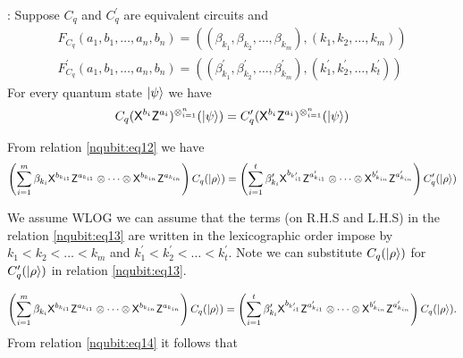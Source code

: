 : Suppose $C_q$ and $C_q^\prime$ are equivalent circuits and 
\begin{equation*}
\begin{aligned}
F_{C_q}(a_1,b_1,\ldots,a_n,b_n)= ((\beta_{k_1}, \beta_{k_2},\ldots, \beta_{k_m}),(k_1,k_2,\ldots, k_m)) \\
F_{C_q}^\prime(a_1,b_1,\ldots,a_n,b_n)= ((\beta_{k_1}^\prime, \beta_{k_2}^\prime,\ldots, \beta_{k_m}^\prime),(k_1^\prime,k_2^\prime,\ldots, k_t^\prime)) 
\end{aligned}
\end{equation*}
For every quantum state ${\lvert}\psi\rangle$ we have
\begin{equation}
\label{nqubit:eq12}
\begin{aligned}
C_q ({\sf X}^{b_i}{\sf Z}^{a_i})^{\otimes_{i=1}^n}({\lvert}\psi\rangle)=C_q^\prime ({\sf X}^{b_i}{\sf Z}^{a_i})^{\otimes_{i=1}^n}({\lvert}\psi\rangle)
\end{aligned}
\end{equation}

From relation \ref{nqubit:eq12} we have
\begin{equation}
\label{nqubit:eq13}
\begin{aligned}
\left(\sum_{i=1}^m \beta_{k_i} {\sf X}^{b_{k_{i1}}} {\sf Z}^{a_{k_{i1}}} \otimes \cdots  \otimes {\sf X}^{b_{k_{in}}} {\sf Z}^{a_{k_{in}}}\right) C_q ({\lvert}\rho\rangle)=\left(\sum_{i=1}^t \beta_{k_i}^\prime {\sf X}^{b_{k_{i1}^\prime}} {\sf Z}^{a_{k_{i1}}^\prime} \otimes \cdots  \otimes {\sf X}^{b_{k_{in}}^\prime} {\sf Z}^{a_{k_{in}}^\prime}\right)C_q^\prime ({\lvert}\rho\rangle)
\end{aligned}
\end{equation}

We assume WLOG we can assume that the terms (on R.H.S and L.H.S) in the relation \ref{nqubit:eq13} are written in the lexicographic order impose by  $k_1<k_2<\ldots <k_m$ and $k_1^\prime<k_2^\prime<\ldots <k_t^\prime.$ Note we can substitute  $C_q({\lvert}\rho\rangle)$ for $C_q^\prime ({\lvert}\rho\rangle)$ in relation \ref{nqubit:eq13}.

\begin{equation}
\label{nqubit:eq14}
\begin{aligned}
\left(\sum_{i=1}^m \beta_{k_i} {\sf X}^{b_{k_{i1}}} {\sf Z}^{a_{k_{i1}}} \otimes \cdots  \otimes {\sf X}^{b_{k_{in}}} {\sf Z}^{a_{k_{in}}}\right) C_q ({\lvert}\rho\rangle)=\left(\sum_{i=1}^t \beta_{k_i}^\prime {\sf X}^{b_{k_{i1}^\prime}} {\sf Z}^{a_{k_{i1}}^\prime} \otimes \cdots  \otimes {\sf X}^{b_{k_{in}}^\prime} {\sf Z}^{a_{k_{in}}^\prime}\right)C_q ({\lvert}\rho\rangle).
\end{aligned}
\end{equation}
From relation \ref{nqubit:eq14} it follows that 

